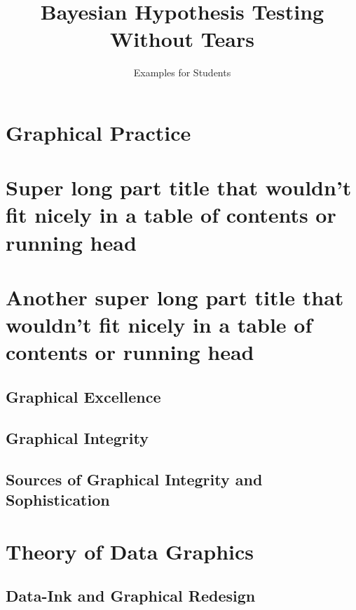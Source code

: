 \documentclass{bayeshyp}
\title{Bayesian Hypothesis Testing Without Tears}
\subtitle{Examples for Students}
\begin{document}
\maketitle

\tableofcontents\thispagestyle{empty}

\mainmatter

\setcounter{secnumdepth}{4}

\part[image={example-image-a}]{Graphical Practice}

\part[image={example-image-b},image-options={width=0.25\textwidth},toc={Shorter part title}]{Super long part title that wouldn't fit nicely in a table of contents or running head}
\lipsum

\part[toc={Old-style, short title=this}]{Another super long part title that wouldn't fit nicely in a table of contents or running head}

\chapter{Graphical Excellence}
\setcounter{page}{13}

\lipsum

\chapter{Graphical Integrity}
\setcounter{page}{53}

\chapter{Sources of Graphical Integrity and Sophistication}
\setcounter{page}{79}

\part{Theory of Data Graphics}

\chapter{Data-Ink and Graphical Redesign}
\setcounter{page}{91}
\end{document}
